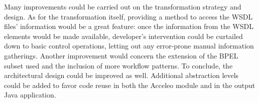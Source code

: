 Many improvements could be carried out on the transformation strategy and design. As for the transformation itself, providing a method to access the WSDL files' information would be a great feature: once the information from the WSDL elements would be made available, developer's intervention could be curtailed down to basic control operations, letting out any error-prone manual information gatherings.
Another improvement would concern the extension of the BPEL subset used and the inclusion of more workflow patterns.
To conclude, the architectural design could be improved as well. Additional abstraction levels could be added to favor code reuse in both the Acceleo module and in the output Java application. 



